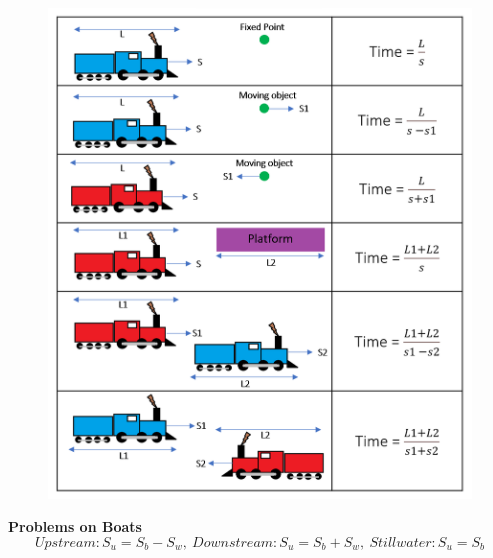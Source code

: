 \begin{figure}[h]
    \centering
    \includegraphics[scale=0.60]{images/train-problems.png}
\end{figure}

\textbf{\large{Problems on Boats}}
\[Upstream: S_u = S_b - S_w,\ Downstream:S_u = S_b + S_w,\ Stillwater: S_u = S_b \]

